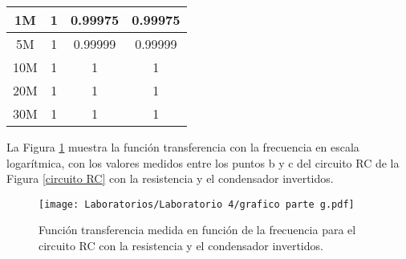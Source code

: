 \documentclass[letterpaper,11pt]{article} %
\begin{document}
\begin{center}
\begin{tabular}{|c|c|c|c|}
1M                           & 1                         & 0.99975                    & 0.99975              \\ \hline
5M                           & 1                         & 0.99999                    & 0.99999              \\ \hline
10M                          & 1                         & 1                          & 1                    \\ \hline
20M                          & 1                         & 1                          & 1                    \\ \hline
30M                          & 1                         & 1                          & 1                    \\ \hline
\end{tabular}
\end{center}
La Figura \ref{parte g} muestra la función transferencia con la frecuencia en escala logarítmica, con los valores medidos entre los puntos b y c del circuito RC de la Figura \ref{circuito RC} con la resistencia y el condensador invertidos.
\begin{figure}
    \centering
    \texttt{[image: Laboratorios/Laboratorio 4/grafico parte g.pdf]}
    \caption{Función transferencia medida en función de la frecuencia para el circuito RC con la resistencia y el condensador invertidos.}
    \label{parte g}
\end{figure}
\end{document}
